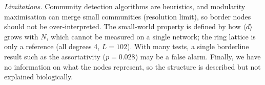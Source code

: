 \documentclass[10pt,a4paper]{article}
\begin{document}
\emph{Limitations.} Community detection algorithms are heuristics, and modularity maximisation can
merge small communities (resolution limit), so border nodes should not be over-interpreted. The
small-world property is defined by how $\langle d\rangle$ grows with $N$, which cannot be measured on
a single network; the ring lattice is only a reference (all degrees 4, $L = 102$). With many tests,
a single borderline result such as the assortativity ($p = 0.028$) may be a false alarm. Finally, we
have no information on what the nodes represent, so the structure is described but not explained
biologically.
\end{document}
